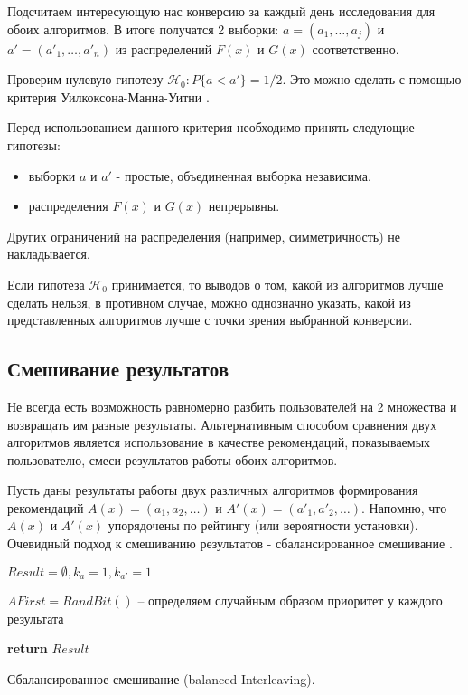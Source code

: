 \documentclass[12pt,a4paper]{report}
\begin{document}
Подсчитаем интересующую нас конверсию за каждый день исследования для обоих алгоритмов. В итоге получатся 2 выборки: $a = (a_1, \dots, a_j)$ и $a' = (a'_1, \dots, a'_n)$ из распределений $F(x)$ и $G(x)$ соответственно.

Проверим нулевую гипотезу $\mathcal{H}_0: \textit{P}\{a < a'\} = 1/2$. Это можно сделать с помощью критерия Уилкоксона-Манна-Уитни \cite{Mw}.

Перед использованием данного критерия необходимо принять следующие гипотезы:
\begin{itemize}
\item выборки $a$ и $a'$ - простые, объединенная выборка независима.
\item распределения $F(x)$ и $G(x)$ непрерывны.
\end{itemize}
Других ограничений на распределения (например, симметричность) не накладывается.

Если гипотеза $\mathcal{H}_0$ принимается, то выводов о том, какой из алгоритмов лучше сделать нельзя, в противном случае, можно однозначно указать, какой из представленных алгоритмов лучше с точки зрения выбранной конверсии.

\subsection{Смешивание результатов}

Не всегда есть возможность равномерно разбить пользователей на 2 множества и возвращать им разные результаты. Альтернативным способом сравнения двух алгоритмов является использование в качестве рекомендаций, показываемых пользователю, смеси результатов работы обоих алгоритмов.

Пусть даны результаты работы двух различных алгоритмов формирования рекомендаций $A(x) = (a_1, a_2, \dots)$ и $A'(x) = (a'_1, a'_2, \dots)$. Напомню, что $A(x)$ и $A'(x)$ упорядочены по рейтингу (или вероятности установки). Очевидный подход к смешиванию результатов - сбалансированное смешивание \cite{In}.

\begin{algorithm}[H]
\SetAlgoLined
{}
$Result = \emptyset, k_a = 1, k_{a'} = 1$

$AFirst = RandBit()$ -- определяем случайным образом приоритет у каждого результата

\textbf{return} $Result$
\caption{Сбалансированное смешивание (balanced Interleaving).}
\label{alg:BI}
\end{algorithm}
\end{document}

